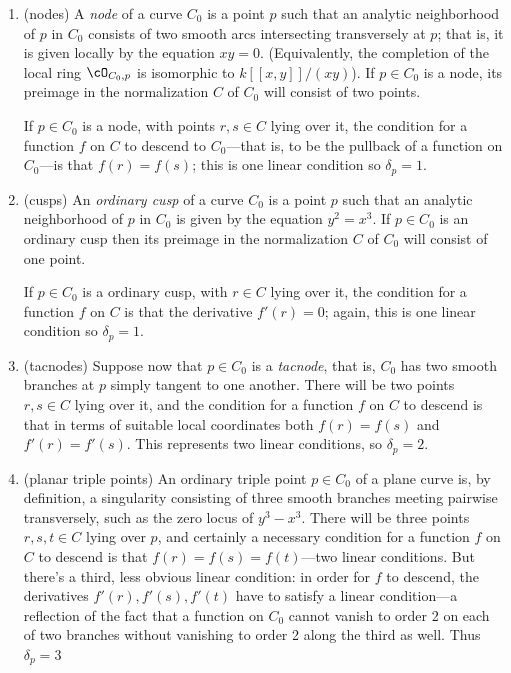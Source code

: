 \begin{enumerate}

\item (nodes) A \emph{node} of a curve $C_0$ is a point $p$ such that an analytic neighborhood of $p$ in $C_0$ consists of two smooth arcs intersecting transversely at $p$; that is, it is given locally by the equation $xy=0$. (Equivalently, the completion of the local ring $\cO_{C_0,p}$ is isomorphic to $k[[x,y]]/(xy)$). If $p \in C_0$ is a node, its preimage in the normalization $C$ of $C_0$ will consist of two points.

If $p \in C_0$ is a node, with points $r,s \in C$ lying over it, the condition for a function $f$ on $C$ to descend to $C_0$---that is, to be the pullback of a function
on $C_0$---is  that $f(r)=f(s)$; this is one linear condition so $\delta_p = 1$.

\item (cusps) An \emph{ordinary cusp} of a curve $C_0$ is a point $p$ such that an analytic neighborhood of $p$ in $C_0$ is given by the equation $y^2=x^3$. If $p \in C_0$ is an ordinary cusp then its preimage in the normalization $C$ of $C_0$ will consist of one point.

If $p \in C_0$ is a ordinary cusp, with  $r \in C$ lying over it, the condition for a function $f$ on $C$  is that the derivative $f'(r)=0$; again, this is one linear condition so $\delta_p = 1$.

\item (tacnodes) Suppose now that $p \in C_0$ is a \emph{tacnode}, that is, $C_0$ has two smooth branches at $p$ simply tangent to one another. There will be two points $r, s \in C$ lying over it, and the condition for a function $f$ on $C$ to descend is that in terms of suitable local coordinates both $f(r)=f(s)$ and $f'(r)=f'(s)$.  This represents two linear conditions, so $\delta_p = 2$.

\item (planar triple points) An ordinary triple point $p \in C_0$ of a plane curve is, by definition, a singularity consisting of three smooth branches meeting pairwise transversely, such as the zero locus of $y^3-x^3$. There will be three points $r,s,t \in C$ lying over $p$, and certainly a necessary condition for a function $f$ on $C$ to descend is that $f(r)=f(s)=f(t)$---two linear conditions. But there's a third, less obvious linear condition: in order for $f$ to descend, the derivatives $f'(r), f'(s), f'(t)$ have to satisfy a linear condition---a reflection of the fact that a function on $C_0$ cannot vanish to order 2 on each of two branches without vanishing to order 2 along the third as well. Thus $\delta_p = 3$


\end{enumerate}
